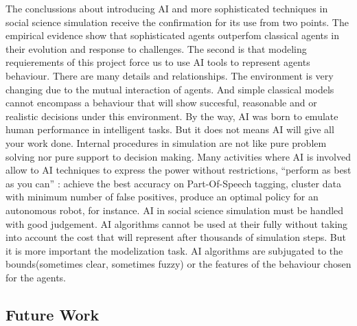 \documentclass[11pt,oneside,a4paper,openright]{report}
\begin{document}
The conclussions about introducing AI and more sophisticated techniques in social science simulation receive
the confirmation for its use from two points. The empirical evidence show that sophisticated agents outperfom
classical agents in their evolution and response to challenges. The second is that modeling requierements of this 
project force us to use AI tools to represent agents behaviour. There are many details and relationships.
The environment is very changing due to the mutual interaction of agents. And simple classical models cannot 
encompass a behaviour that will show succesful, reasonable and or realistic decisions under this environment.
By the way, AI was born to emulate human performance in intelligent tasks. But it does not means AI will give all your work done. Internal procedures in simulation are not like pure problem solving nor pure support to decision making. Many activities where AI is involved allow to AI techniques to express the power without restrictions, ``perform as best as you can'' : achieve the best accuracy on Part-Of-Speech tagging, cluster data with minimum number of false positives, produce an optimal policy for an autonomous robot, for instance. AI in social science simulation must be handled with good judgement. AI algorithms cannot be used at their fully without taking into account the cost that will represent after thousands of simulation steps. But it is more important the modelization task. AI algorithms are subjugated to the bounds(sometimes clear, sometimes fuzzy) or the features of the behaviour chosen for the agents. 

\subsection{Future Work}
\end{document}
